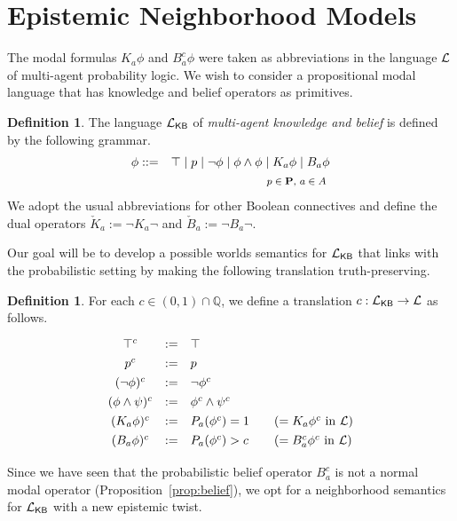 \documentclass[12pt]{article}
\theoremstyle{definition}
\newtheorem{definition}[theorem]{Definition}
\newcommand{\Rat}{\mathbb{Q}}  %
\newcommand{\Prop}{{\bf P}}    %
\newcommand{\Lang}{{\cal L}}   %
\newcommand{\KB}{{\mathsf{KB}}}                     %
\begin{document}
\section{Epistemic Neighborhood Models}
\label{Section:ENM}

The modal formulas $K_a\phi$ and $B_a^c\phi$ were taken as
abbreviations in the language $\Lang$ of multi-agent probability
logic.  We wish to consider a propositional modal language that has
knowledge and belief operators as primitives.

\begin{definition}
  The language $\Lang_\KB$ of \emph{multi-agent knowledge and belief}
  is defined by the following grammar.
  \begin{eqnarray*}
    \phi & ::= & 
    \top \mid p \mid \neg\phi \mid \phi\land\phi \mid
    K_a\phi \mid B_a\phi
    \\
    &&
    \text{\footnotesize 
      $p\in\Prop$,
      $a\in A$
    }
  \end{eqnarray*}
  We adopt the usual abbreviations for other Boolean connectives and
  define the dual operators $\check K_a:=\lnot K_a\lnot$ and $\check
  B_a:=\lnot B_a\lnot$.
\end{definition}

Our goal will be to develop a possible worlds semantics for
$\Lang_\KB$ that links with the probabilistic setting by making the
following translation truth-preserving.

\begin{definition}
  \label{definition:s}
  For each $c\in(0,1)\cap\Rat$, we define a translation $c:
  \Lang_\KB \to \Lang$ as follows.
  \[
  \renewcommand{\arraystretch}{1.3}
  \begin{array}{ccl@{\qquad}l}
    \top^c & := & \top
    \\
    p^c & := & p 
    \\
    (\neg \phi)^c & := & \neg \phi^c 
    \\
    (\phi \land \psi)^c & := & \phi^c \land \psi^c 
    \\
    (K_a\phi)^c & := & P_a(\phi^c) = 1
    & (= K_a\phi^c \text{ in } \Lang)
    \\
    (B_a\phi)^c & := & \textstyle P_a(\phi^c) > c
    & (= B_a^c\phi^c \text{ in } \Lang)
  \end{array}
  \]
\end{definition} 

Since we have seen that the probabilistic belief operator $B_a^c$ is
not a normal modal operator (Proposition~\ref{prop:belief}), we opt
for a neighborhood semantics for $\Lang_\KB$ \cite[Ch 7]{Chellas:ml}
with a new epistemic twist.
\end{document}
